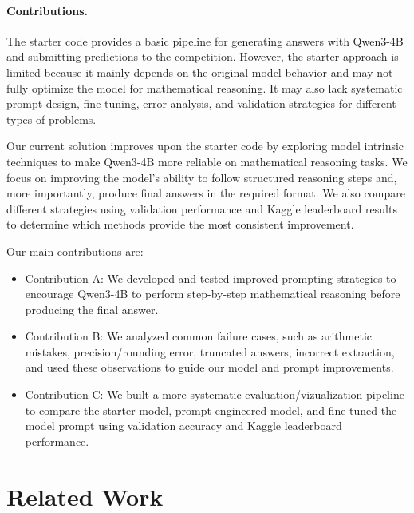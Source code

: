 \documentclass{article}
\begin{document}
\paragraph{Contributions.}

The starter code provides a basic pipeline for generating answers with Qwen3-4B and submitting predictions to the competition. However, the starter approach is limited because it mainly depends on the original model behavior and may not fully optimize the model for mathematical reasoning. It may also lack systematic prompt design, fine tuning, error analysis, and validation strategies for different types of problems.

Our current solution improves upon the starter code by exploring model intrinsic techniques to make Qwen3-4B more reliable on mathematical reasoning tasks. We focus on improving the model’s ability to follow structured reasoning steps and, more importantly, produce final answers in the required format. We also compare different strategies using validation performance and Kaggle leaderboard results to determine which methods provide the most consistent improvement.

Our main contributions are:
\begin{itemize}
  \item Contribution A: We developed and tested improved prompting strategies to encourage Qwen3-4B to perform step-by-step mathematical reasoning before producing the final answer.
  \item Contribution B: We analyzed common failure cases, such as arithmetic mistakes, precision/rounding error, truncated answers, incorrect extraction, and used these observations to guide our model and prompt improvements.
  \item Contribution C: We built a more systematic evaluation/vizualization pipeline to compare the starter model, prompt engineered model, and fine tuned the model prompt using validation accuracy and Kaggle leaderboard performance.
\end{itemize}


\section{Related Work}
\label{sec:relatedwork}
\end{document}
